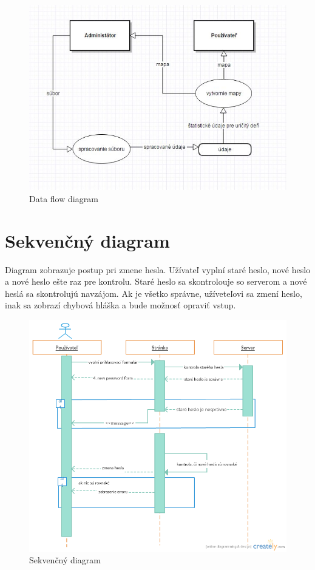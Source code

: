 \documentclass[12pt,a4paper]{report}
\begin{document}
	\begin{figure}[htb]
		\includegraphics[scale=0.5]{data_flow}
		\caption[Data flow diagram]{Data flow diagram}
		\label{fig:Data flow diagram}
	\end{figure}
\clearpage
\section[Sekvenčný diagram]{\rmfamily\bfseries
		Sekvenčný diagram}
	Diagram zobrazuje postup pri zmene hesla. Užívateľ vyplní staré heslo, nové heslo a nové heslo ešte raz pre kontrolu. Staré heslo sa skontrolouje so serverom a nové heslá sa skontrolujú navzájom. Ak je všetko správne, užíveteľovi sa zmení heslo, inak sa zobrazí chybová hláška a bude možnosť opraviť vstup.
	
	\begin{figure}[htb]
		\includegraphics[scale=0.5]{sequence}
		\caption[Data flow diagram]{Sekvenčný diagram}
		\label{fig:Sekvenčný diagram}
	\end{figure}
\end{document}
